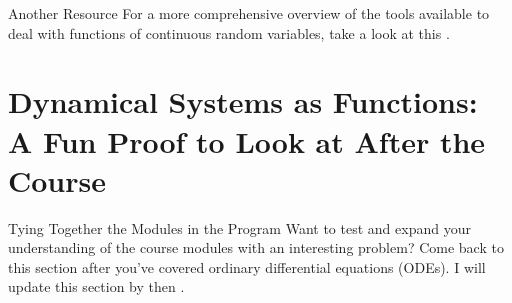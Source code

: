 \documentclass[10pt]{beamer}
\begin{document}
\begin{frame}[fragile]{Another Resource}
For a more comprehensive overview of the tools available to deal with functions of continuous random variables, take a look at this \href{https://en.wikibooks.org/wiki/Probability/Transformation_of_Probability_Densities}{\color{mLightBrown}{Wikibook}}.
\end{frame}

\section{Dynamical Systems as Functions: A Fun Proof to Look at After the Course}

\begin{frame}[fragile]{Tying Together the Modules in the Program}
Want to test and expand your understanding of the course modules with an interesting problem? Come back to this section after you've covered ordinary differential equations (ODEs). I will update this section by then .


\end{frame}

\end{document}
